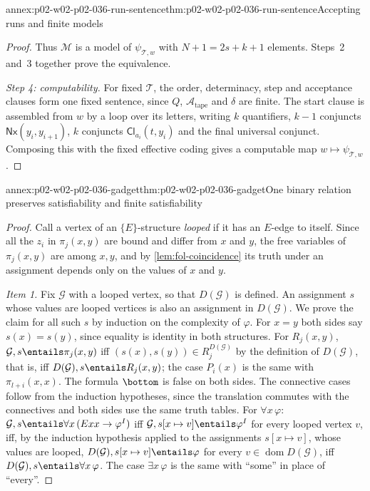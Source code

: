 \begin{annexitem}{annex:p02-w02-p02-036-run-sentence}{thm:p02-w02-p02-036-run-sentence}{Accepting runs and finite models}
\begin{proof}
Thus \(\mathcal M\) is a model of \(\psi_{\mathcal T,w}\) with \(N+1=2s+k+1\)
elements.  Steps~2 and~3 together prove the equivalence.

\emph{Step 4: computability.}  For fixed \(\mathcal T\), the order,
determinacy, step and acceptance clauses form one fixed sentence, since \(Q\),
\(\mathcal A_{\mathrm{tape}}\) and \(\delta\) are finite.  The start clause is
assembled from \(w\) by a loop over its letters, writing \(k\) quantifiers,
\(k-1\) conjuncts \(\mathsf{Nx}(y_i,y_{i+1})\), \(k\) conjuncts
\(\mathsf{Cl}_{a_i}(t,y_i)\) and the final universal conjunct.  Composing this
with the fixed effective coding gives a computable map
\(w\mapsto\psi_{\mathcal T,w}\).
\end{proof}
\end{annexitem}

\begin{annexitem}{annex:p02-w02-p02-036-gadget}{thm:p02-w02-p02-036-gadget}{One binary relation preserves satisfiability and finite satisfiability}
\begin{proof}
Call a vertex of an \(\{E\}\)-structure \emph{looped} if it has an \(E\)-edge to
itself.  Since all the \(z_i\) in \(\pi_j(x,y)\) are bound and differ from
\(x\) and \(y\), the free variables of \(\pi_j(x,y)\) are among \(x,y\), and
by \cref{lem:fol-coincidence} its truth under an assignment depends only on
the values of \(x\) and \(y\).

\emph{Item 1.}  Fix \(\mathcal G\) with a looped vertex, so that
\(D(\mathcal G)\) is defined.  An assignment \(s\) whose values are looped
vertices is also an assignment in \(D(\mathcal G)\).  We prove the claim for
all such \(s\) by induction on the complexity of \(\varphi\).  For
\(x=y\) both sides say \(s(x)=s(y)\), since equality is identity in both
structures.  For \(R_j(x,y)\), \(\mathcal G,s\entails\pi_j(x,y)\) iff
\((s(x),s(y))\in R_j^{D(\mathcal G)}\) by the definition of
\(D(\mathcal G)\), that is, iff \(D(\mathcal G),s\entails R_j(x,y)\); the
case \(P_i(x)\) is the same with \(\pi_{l+i}(x,x)\).  The formula \(\bottom\)
is false on both sides.  The connective cases follow from the induction
hypotheses, since the translation commutes with the connectives and both
sides use the same truth tables.  For \(\forall x\,\varphi\):
\(\mathcal G,s\entails\forall x\,(Exx\to\varphi^{I})\) iff
\(\mathcal G,s[x\mapsto v]\entails\varphi^{I}\) for every looped vertex \(v\),
iff, by the induction hypothesis applied to the assignments
\(s[x\mapsto v]\), whose values are looped, \(D(\mathcal G),s[x\mapsto v]
\entails\varphi\) for every \(v\in\operatorname{dom}D(\mathcal G)\), iff
\(D(\mathcal G),s\entails\forall x\,\varphi\).  The case \(\exists x\,\varphi\)
is the same with ``some'' in place of ``every''.


\end{proof}
\end{annexitem}
